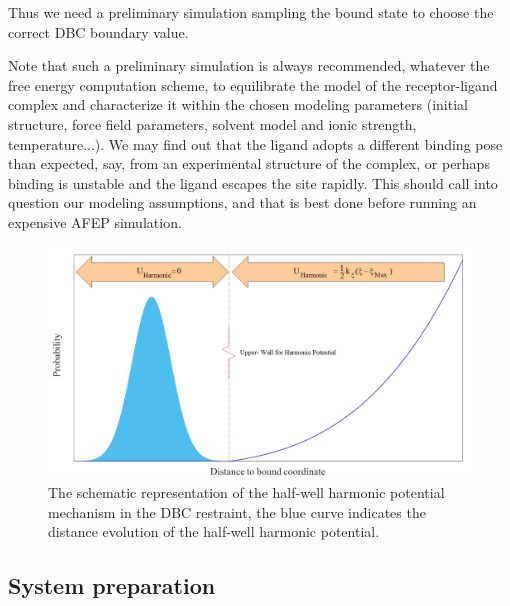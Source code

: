 \documentclass[9pt,tutorial]{livecoms}
\begin{document}
Thus we need a preliminary simulation sampling the bound state to choose the correct DBC boundary value.

Note that such a preliminary simulation is always recommended, whatever the free energy computation scheme, to equilibrate the model of the receptor-ligand complex and characterize it within the chosen modeling parameters (initial structure, force field parameters, solvent model and ionic strength, temperature...).
We may find out that the ligand adopts a different binding pose than expected, say, from an experimental structure of the complex, or perhaps binding is unstable and the ligand escapes the site rapidly.
This should call into question our modeling assumptions, and that is best done before running an expensive AFEP simulation.

\begin{figure}[!ht]
\centering
\includegraphics[width=\linewidth]{scheme}
\caption{The schematic representation of the half-well harmonic potential mechanism in the DBC restraint, the blue curve indicates the distance evolution of the half-well harmonic potential.}
\label{fig:scheme-DBC}
\end{figure}



\subsection{System preparation }
\label{sec:6.1}
\end{document}
